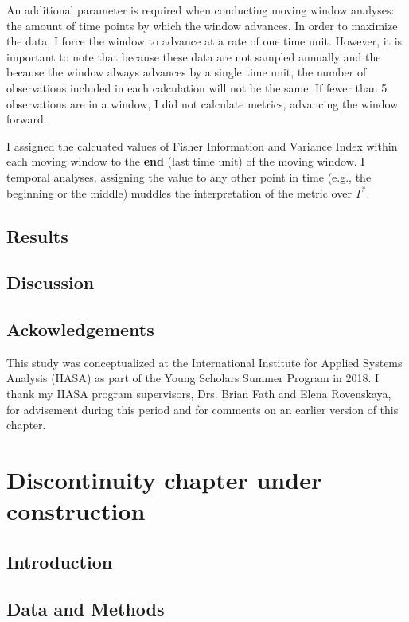 \documentclass[12pt,twoside,openany]{reedthesis}
\begin{document}
An additional parameter is required when conducting moving window
analyses: the amount of time points by which the window advances. In
order to maximize the data, I force the window to advance at a rate of
one time unit. However, it is important to note that because these data
are not sampled annually and the because the window always advances by a
single time unit, the number of observations included in each
calculation will not be the same. If fewer than 5 observations are in a
window, I did not calculate metrics, advancing the window forward.

I assigned the calcuated values of Fisher Information and Variance Index
within each moving window to the \textbf{end} (last time unit) of the
moving window. I temporal analyses, assigning the value to any other
point in time (e.g., the beginning or the middle) muddles the
interpretation of the metric over \(T^*\).

\section{Results}\label{results-2}

\section{Discussion}\label{discussion-3}

\section{Ackowledgements}\label{ackowledgements}

This study was conceptualized at the International Institute for Applied
Systems Analysis (IIASA) as part of the Young Scholars Summer Program in
2018. I thank my IIASA program supervisors, Drs. Brian Fath and Elena
Rovenskaya, for advisement during this period and for comments on an
earlier version of this chapter.

\chapter{Discontinuity chapter under construction}\label{discontinuity}

\section{Introduction}\label{introduction-5}

\section{Data and Methods}\label{data-and-methods-2}
\end{document}
